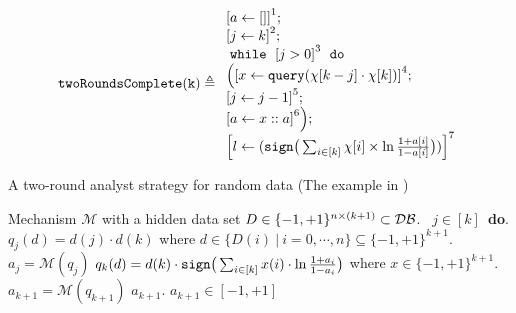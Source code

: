 \begin{example}
        \label{ex:twoRoundsComplete}
        \[
            \kw{twoRoundsComplete(k)} \triangleq
        \begin{array}{l}
               \clabel{ a \leftarrow []}^{1} ; \\
                \clabel{\assign{j}{k} }^{2} ; \\
                \ewhile ~ \clabel{j > 0}^{3} ~ \edo ~ \\
                \Big(
                 \clabel{\assign{x}{\query(\chi[k - j]\cdot \chi[k])} }^{4}  ; \\
                 \clabel{\assign{j}{j-1}}^{5} ;\\
                \clabel{a \leftarrow x :: a}^{6}       \Big);\\
                \clabel{l \leftarrow (\kw{sign}\big (\sum_{i\in [k]} \chi[i]\times\ln\frac{1+a[i]}{1-a[i]} \big ))}^{7}\\
            \end{array}
        \]
        \begin{algorithm}
        \footnotesize
        \caption{A two-round analyst strategy for random data (The example in  \cite{dwork2015preserving})}
        \label{alg:twoRound}
        \begin{algorithmic}
        \REQUIRE Mechanism $\mathcal{M}$ with a hidden data set $D \in \{-1,+1\}^{n\times (k+1)} \subset \mathcal{DB}$.
        \ $j\in [k]$\ {\bf do}.  
        \STATE {} $q_j(d)=d(j)\cdot d(k)$ where $d \in \{D(i) ~|~ i = 0, \cdots, n\} \subseteq \{-1,+1\}^{k+1}$.
        \STATE {} $a_j=\mathcal{M}(q_j)$ 
        \STATE \qquad {}
         $q_{k}(d)= d(k) \cdot \mathtt{sign}\big (\sum_{i\in [k]} x(i) \cdot \ln\frac{1+a_i}{1-a_i} \big )$ where $x\in \{-1,+1\}^{k+1}$.
        \STATE{}
         $a_{k+1}=\mathcal{M}(q_{k+1})$
        \STATE{}
        \RETURN $a_{k+1}$.
        \ENSURE $a_{k+1}\in [-1,+1]$
        \end{algorithmic}
        \end{algorithm}
        \end{example}
    
